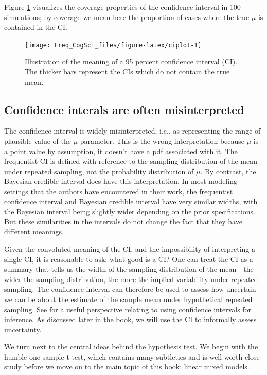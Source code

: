 \documentclass[
  12pt,
]{krantz}
\theoremstyle{definition}
\theoremstyle{definition}
\theoremstyle{definition}
\theoremstyle{definition}
\theoremstyle{remark}
\begin{document}
Figure \ref{fig:ciplot} visualizes the coverage properties of the confidence interval in 100 simulations; by coverage we mean here the proportion of cases where the true \(\mu\) is contained in the CI.

\begin{figure}
\texttt{[image: Freq\_CogSci\_files/figure-latex/ciplot-1]} \caption{Illustration of the meaning of a  95 percent confidence interval (CI). The thicker bars represent the CIs which do not contain the true mean.}\label{fig:ciplot}
\end{figure}

\hypertarget{confidence-interals-are-often-misinterpreted}{%
\subsection{Confidence interals are often misinterpreted}\label{confidence-interals-are-often-misinterpreted}}

The confidence interval is widely misinterpreted, i.e., as representing the range of plausible value of the \(\mu\) parameter. This is the wrong interpretation because \(\mu\) is a point value by assumption, it doesn't have a pdf associated with it. The frequentist CI is defined with reference to the sampling distribution of the mean under repeated sampling, not the probability distribution of \(\mu\).
By contrast, the Bayesian credible interval does have this interpretation.
In most modeling settings that the authors have encountered in their work, the frequentist confidence interval and Bayesian credible interval have very similar widths, with the Bayesian interval being slightly wider depending on the prior specifications. But these similarities in the intervals do not change the fact that they have different meanings.

Given the convoluted meaning of the CI, and the impossibility of interpreting a single CI, it is reasonable to ask: what good is a CI? One can treat the CI as a summary that tells us the width of the sampling distribution of the mean---the wider the sampling distribution, the more the implied variability under repeated sampling. The confidence interval can therefore be used to assess how uncertain we can be about the estimate of the sample mean under hypothetical repeated sampling. See \citet{cumming2014new} for a useful perspective relating to using confidence intervals for inference. As discussed later in the book, we will use the CI to informally assess uncertainty.

We turn next to the central ideas behind the hypothesis test. We begin with the humble one-sample t-test, which contains many subtleties and is well worth close study before we move on to the main topic of this book: linear mixed models.
\end{document}

